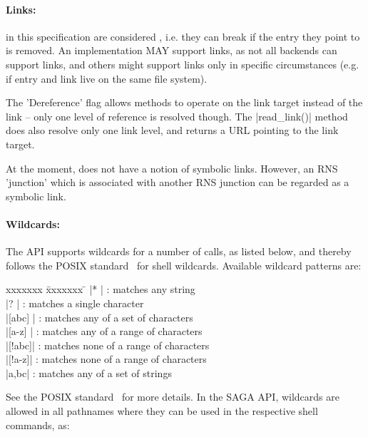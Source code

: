  
   \paragraph{Links:}
 
      in this specification are considered , i.e. they can break if the entry they point to is
     removed.  An implementation MAY support links, as not all
     backends can support links, and others might support links
     only in specific circumstances (e.g. if entry and link live
     on the same file system).
 
     The 'Dereference' flag allows methods to operate on the
     link target instead of the link -- only one level of
     reference is resolved though.  The |read_link()| method
     does also resolve only one link level, and returns a URL
     pointing to the link target.
 
     At the moment, \cite{rns} does not have a notion
     of symbolic links.  However, an RNS 'junction' which is
     associated with another RNS junction can be regarded as
     a symbolic link.
 
 
  \paragraph{Wildcards:}
 
    The API supports wildcards for a
    number of calls, as listed below, and thereby follows the POSIX
    standard~\cite{posix1,posix2,posix3} for shell
    wildcards.  Available wildcard patterns are:
 
    \begin{tabbing}
    xxxxxxx \= xxxxxxx  \= \kill
            \> |*     | \> : matches any string\\
            \> |?     | \> : matches a single character\\
            \> |[abc] | \> : matches any  of a set of characters\\
            \> |[a-z] | \> : matches any  of a range of characters\\
            \> |[!abc]| \> : matches none of a range of characters\\
            \> |[!a-z]| \> : matches none of a range of characters\\
            \> |{a,bc}| \> : matches any  of a set of strings\\
    \end{tabbing}
 
    See the POSIX standard~\cite{posix1,posix2,posix3} for
    more details.  In the SAGA API, wildcards are allowed
    in all pathnames where they can be used in the respective
    shell commands, as:
 
